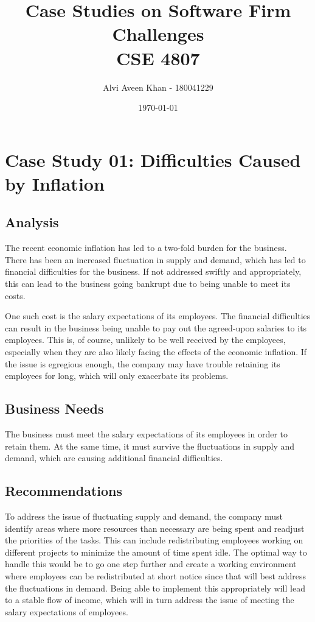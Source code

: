 \documentclass{article}
\title{Case Studies on Software Firm Challenges\\CSE 4807}
\author{Alvi Aveen Khan - 180041229}
\date{\today}
\begin{document}
\maketitle

\section{Case Study 01: Difficulties Caused by Inflation}
\subsection{Analysis}
The recent economic inflation has led to a two-fold burden for the business. There has been an increased fluctuation in supply and demand, which has led to financial difficulties for the business. If not addressed swiftly and appropriately, this can lead to the business going bankrupt due to being unable to meet its costs.

One such cost is the salary expectations of its employees. The financial difficulties can result in the business being unable to pay out the agreed-upon salaries to its employees. This is, of course, unlikely to be well received by the employees, especially when they are also likely facing the effects of the economic inflation. If the issue is egregious enough, the company may have trouble retaining its employees for long, which will only exacerbate its problems.

\subsection{Business Needs}
The business must meet the salary expectations of its employees in order to retain them. At the same time, it must survive the fluctuations in supply and demand, which are causing additional financial difficulties.

\subsection{Recommendations}
To address the issue of fluctuating supply and demand, the company must identify areas where more resources than necessary are being spent and readjust the priorities of the tasks. This can include redistributing employees working on different projects to minimize the amount of time spent idle. The optimal way to handle this would be to go one step further and create a working environment where employees can be redistributed at short notice since that will best address the fluctuations in demand. Being able to implement this appropriately will lead to a stable flow of income, which will in turn address the issue of meeting the salary expectations of employees.
\end{document}
